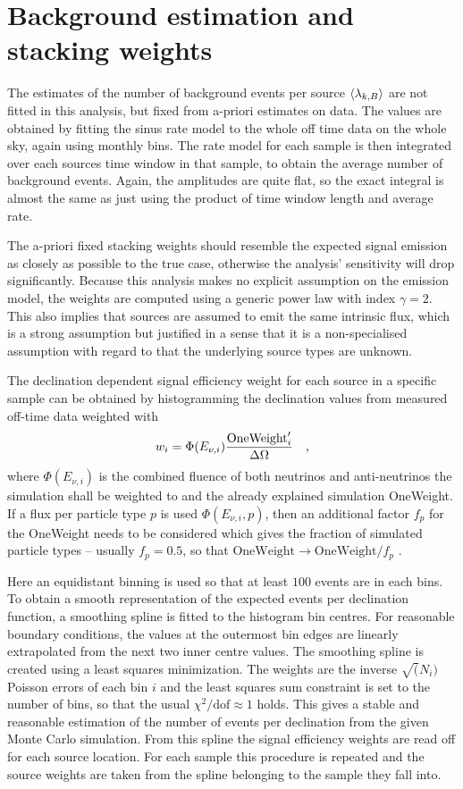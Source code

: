 \section{Background estimation and stacking weights}
The estimates of the number of background events per source $\Braket{\lambda_{k,B}}$ are not fitted in this analysis, but fixed from a-priori estimates on data.
The values are obtained by fitting the sinus rate model to the whole off time data on the whole sky, again using monthly bins.
The rate model for each sample is then integrated over each sources time window in that sample, to obtain the average number of background events.
Again, the amplitudes are quite flat, so the exact integral is almost the same as just using the product of time window length and average rate.

The a-priori fixed stacking weights should resemble the expected signal emission as closely as possible to the true case, otherwise the analysis' sensitivity will drop significantly.
Because this analysis makes no explicit assumption on the emission model, the weights are computed using a generic power law with index $\gamma=2$.
This also implies that sources are assumed to emit the same intrinsic flux, which is a strong assumption but justified in a sense that it is a non-specialised assumption with regard to that the underlying source types are unknown.

The declination dependent signal efficiency weight for each source in a specific sample can be obtained by histogramming the declination values from measured off-time data weighted with
\begin{equation}
  w_i = \Phi(E_{\nu,i})\frac{\text{OneWeight}'_i}{\Delta\Omega}
  \quad\text{,}
\end{equation}
where $\Phi(E_{\nu,i})$ is the combined fluence of both neutrinos and anti-neutrinos the simulation shall be weighted to and the already explained simulation OneWeight.
If a flux per particle type $p$ is used $\Phi(E_{\nu,i}, p)$, then an additional factor $f_p$ for the OneWeight needs to be considered which gives the fraction of simulated particle types – usually $f_p=0.5$, so that $\text{OneWeight}\rightarrow\text{OneWeight}/f_p$ .

Here an equidistant binning is used so that at least $100$ events are in each bins.
To obtain a smooth representation of the expected events per declination function, a smoothing spline is fitted to the histogram bin centres.
For reasonable boundary conditions, the values at the outermost bin edges are linearly extrapolated from the next two inner centre values.
The smoothing spline is created using a least squares minimization.
The weights are the inverse $\sqrt(N_i)$ Poisson errors of each bin $i$ and the least squares sum constraint is set to the number of bins, so that the usual $\chi^2 / \text{dof} \approx 1$ holds.
This gives a stable and reasonable estimation of the number of events per declination from the given Monte Carlo simulation.
From this spline the signal efficiency weights are read off for each source location.
For each sample this procedure is repeated and the source weights are taken from the spline belonging to the sample they fall into.


